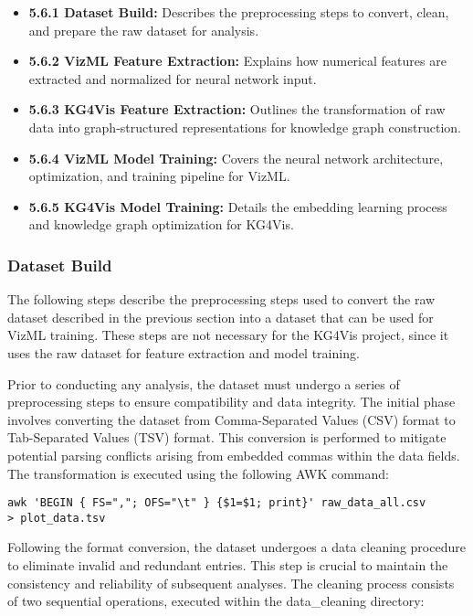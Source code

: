 \begin{itemize}
    \item \textbf {5.6.1 Dataset Build:} Describes the preprocessing steps to convert, clean, and prepare the raw dataset for analysis.
    \item \textbf {5.6.2 VizML Feature Extraction:} Explains how numerical features are extracted and normalized for neural network input.
    \item \textbf {5.6.3 KG4Vis Feature Extraction:} Outlines the transformation of raw data into graph-structured representations for knowledge graph construction.
    \item \textbf {5.6.4 VizML Model Training:} Covers the neural network architecture, optimization, and training pipeline for VizML.
    \item \textbf {5.6.5 KG4Vis Model Training:} Details the embedding learning process and knowledge graph optimization for KG4Vis.
    
\end{itemize}


\subsubsection{ Dataset Build}
The following steps describe the preprocessing steps used to convert the raw dataset described in the previous section into a dataset that can be used for VizML training. These steps are not necessary for the KG4Vis project, since it uses the raw dataset for feature extraction and model training.

Prior to conducting any analysis, the dataset must undergo a series of preprocessing steps to ensure compatibility and data integrity. The initial phase involves converting the dataset from Comma-Separated Values (CSV) format to Tab-Separated Values (TSV) format. This conversion is performed to mitigate potential parsing conflicts arising from embedded commas within the data fields. The transformation is executed using the following AWK command:
\begin{verbatim}
awk 'BEGIN { FS=","; OFS="\t" } {$1=$1; print}' raw_data_all.csv
> plot_data.tsv 
\end{verbatim}

Following the format conversion, the dataset undergoes a data cleaning procedure to eliminate invalid and redundant entries. This step is crucial to maintain the consistency and reliability of subsequent analyses. The cleaning process consists of two sequential operations, executed within the data\_cleaning directory:

